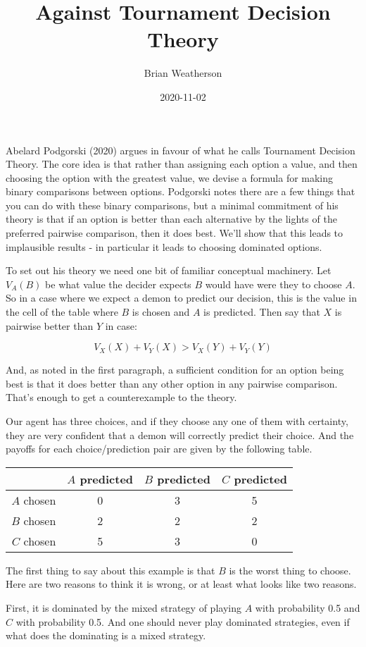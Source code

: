 \documentclass[11pt,]{article}
\title{Against Tournament Decision Theory}
\author{Brian Weatherson}
\date{2020-11-02}
\begin{document}
\maketitle

Abelard Podgorski (2020) argues in favour of what he calls Tournament Decision Theory. The core idea is that rather than assigning each option a value, and then choosing the option with the greatest value, we devise a formula for making binary comparisons between options. Podgorski notes there are a few things that you can do with these binary comparisons, but a minimal commitment of his theory is that if an option is better than each alternative by the lights of the preferred pairwise comparison, then it does best. We'll show that this leads to implausible results - in particular it leads to choosing dominated options.

To set out his theory we need one bit of familiar conceptual machinery. Let \(V_A(B)\) be what value the decider expects \(B\) would have were they to choose \(A\). So in a case where we expect a demon to predict our decision, this is the value in the cell of the table where \(B\) is chosen and \(A\) is predicted. Then say that \(X\) is pairwise better than \(Y\) in case:

\[
V_X(X) + V_Y(X) > V_X(Y) + V_Y(Y)
\]

And, as noted in the first paragraph, a sufficient condition for an option being best is that it does better than any other option in any pairwise comparison. That's enough to get a counterexample to the theory.

Our agent has three choices, and if they choose any one of them with certainty, they are very confident that a demon will correctly predict their choice. And the payoffs for each choice/prediction pair are given by the following table.

\begin{longtable}[]{@{}rccc@{}}
\toprule
& \(A\) predicted & \(B\) predicted & \(C\) predicted\tabularnewline
\midrule
\endhead
\(A\) chosen & 0 & 3 & 5\tabularnewline
\(B\) chosen & 2 & 2 & 2\tabularnewline
\(C\) chosen & 5 & 3 & 0\tabularnewline
\bottomrule
\end{longtable}

The first thing to say about this example is that \(B\) is the worst thing to choose. Here are two reasons to think it is wrong, or at least what looks like two reasons.

First, it is dominated by the mixed strategy of playing \(A\) with probability 0.5 and \(C\) with probability 0.5. And one should never play dominated strategies, even if what does the dominating is a mixed strategy.
\end{document}
